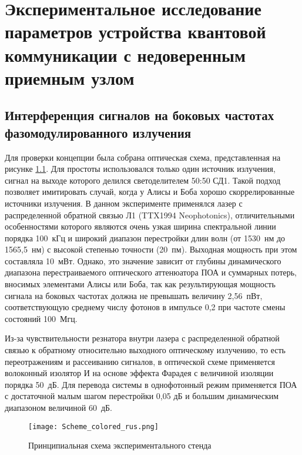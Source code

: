\chapter{Экспериментальное исследование параметров устройства квантовой коммуникации с недоверенным приемным узлом} \label{ch:ch5}
\section{Интерференция сигналов на боковых частотах фазомодулированного излучения} \label{ch:ch5/sec1}

Для проверки концепции была собрана оптическая схема, представленная на рисунке \ref{fig:RF_sin}. Для простоты использовался только один источник излучения, сигнал на выходе которого делился светоделителем 50:50 СД1. Такой подход позволяет имитировать случай, когда у Алисы и Боба хорошо скоррелированные источники излучения. В данном эксперименте применялся лазер с распределенной обратной связью Л1 (TTX1994 Neophotonics), отличительными особенностями которого являются очень узкая ширина спектральной линии порядка 100~кГц и широкий диапазон перестройки длин волн (от 1530~нм до 1565,5~нм) с высокой степенью точности (20~пм). Выходная мощность при этом составляла 10~мВт. Однако, это значение зависит от глубины динамического диапазона перестраиваемого оптического аттенюатора ПОА и суммарных потерь, вносимых элементами Алисы или Боба, так как результирующая мощность сигнала на боковых частотах должна не превышать величину 2,56~пВт, соответствующую среднему числу фотонов в импульсе 0,2 при частоте смены состояний 100~Мгц.   

Из-за чувствительности резнатора внутри лазера с распределенной обратной связью к обратному относительно выходного оптическому излучению, то есть переотражениям и рассеиванию сигналов, в оптической схеме применяется волоконный изолятор И на основе эффекта Фарадея с величиной изоляции порядка 50~дБ. Для перевода системы в однофотонный режим применяется ПОА с достаточной малым шагом перестройки 0,05 дБ и большим динамическим диапазоном величиной 60~дБ.  

 \begin{figure}[ht]
  \centering
  \texttt{[image: Scheme\_colored\_rus.png]}
  \caption{Принципиальная схема экспериментального стенда}
  \label{fig:RF_sin}
\end{figure}

